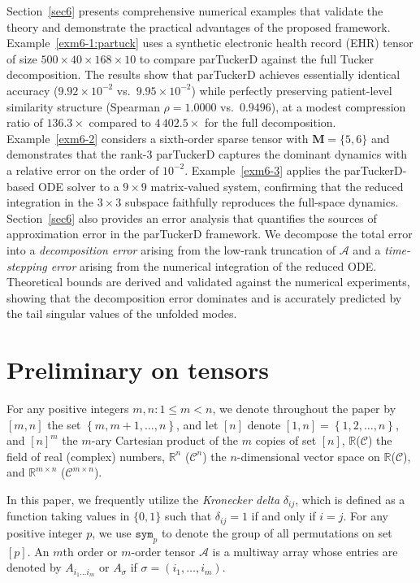 \documentclass[11pt, oneside]{article}  %
\newcommand{\set}[1]{\left\{#1\right\}}
\newcommand{\Sym}{\texttt{sym}}
\newcommand{\si}{\sigma}
\newcommand{\RR}{\mathbb{R}}
\newcommand{\A}{\mathcal{A}}
\newcommand{\C}{\mathcal{C}}
\newcommand{\caM}{\mathbf{M}}
\begin{document}
Section~\ref{sec6} presents comprehensive numerical examples that validate the theory and demonstrate the practical advantages of the proposed framework.  Example~\ref{exm6-1:partuck} uses a synthetic electronic health record (EHR) tensor of size $500\times 40\times 168\times 10$ to compare parTuckerD against the full Tucker decomposition. The results show that parTuckerD achieves essentially identical accuracy ($9.92\times 10^{-2}$ vs.\ $9.95\times 10^{-2}$) while perfectly preserving patient-level similarity structure (Spearman $\rho=1.0000$ vs.\ $0.9496$), at a modest compression ratio of $136.3\times$ compared to $4\,402.5\times$ for the full decomposition. Example~\ref{exm6-2} considers a sixth-order sparse tensor with $\caM=\{5,6\}$ and demonstrates that the rank-3 parTuckerD captures the dominant dynamics with a relative error on the order of $10^{-2}$. Example~\ref{exm6-3} applies the parTuckerD-based ODE solver to a $9\times 9$ matrix-valued system, confirming that the reduced integration in the $3\times 3$ subspace faithfully reproduces the full-space dynamics.  Section~\ref{sec6} also provides an error analysis that quantifies the sources of approximation error in the parTuckerD framework.  We decompose the total error into a \emph{decomposition error} arising from the low-rank truncation of $\A$ and a \emph{time-stepping error} arising from the numerical integration of the reduced ODE.  Theoretical bounds are derived and validated against the numerical experiments, showing that the decomposition error dominates and is accurately predicted by the tail singular values of the unfolded modes.


\vskip 5pt
\section{Preliminary on tensors}
\label{sec2}
\setcounter{equation}{0}

For any positive integers $m,n\colon 1\le m < n$, we denote throughout the paper by $[m,n]$ the set $\set{m, m+1, \ldots, n}$, and let $[n]$ denote 
$[1,n] =\set{1,2,\ldots, n}$, and $[n]^{m}$ the $m$-ary Cartesian product of the $m$ copies of set $[n]$,  $\RR$($\C$) the field of real (complex) numbers, $\RR^{n}$ ($\C^{n}$) the $n$-dimensional vector space on $\RR$($\C$), and $\RR^{m\times n}$ ($\C^{m\times n}$). 

In this paper, we frequently utilize the \emph{Kronecker delta} $\delta_{ij}$, which is defined as a function taking values in $\{0,1\}$ such that 
$\delta_{ij} = 1$ if and only if $i = j$.  For any positive integer $p$, we use $\Sym_{p}$ to denote the group of all permutations on set $[p]$.  
An $m$th order or $m$-order tensor $\A$ is a multiway array whose entries are denoted by $A_{i_1\ldots i_m}$ or $A_{\si}$ if 
$\si=(i_1,\ldots, i_m)$.  
\end{document}
